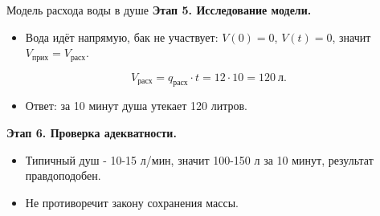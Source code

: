 \documentclass{beamer}
\begin{document}
    \begin{frame}{Модель расхода воды в душе}
        \textbf{Этап 5. Исследование модели.}
        \begin{itemize}
            \item Вода идёт напрямую, бак не участвует:
                $V(0) = 0$, $V(t) = 0$, значит
                $V_{\text{прих}} = V_{\text{расх}}$.
        \end{itemize}
        \[
            V_{\text{расх}} = q_{\text{расх}} \cdot t = 12 \cdot 10 = 120\ \text{л}.
        \]
        \begin{itemize}
            \item Ответ: за 10 минут душа утекает 120 литров.
        \end{itemize}

        \medskip
        \textbf{Этап 6. Проверка адекватности.}
        \begin{itemize}
            \item Типичный душ - 10-15 л/мин, значит 100-150 л за 10 минут,
                результат правдоподобен.
            \item Не противоречит закону сохранения массы.
        \end{itemize}
    \end{frame}
\end{document}
